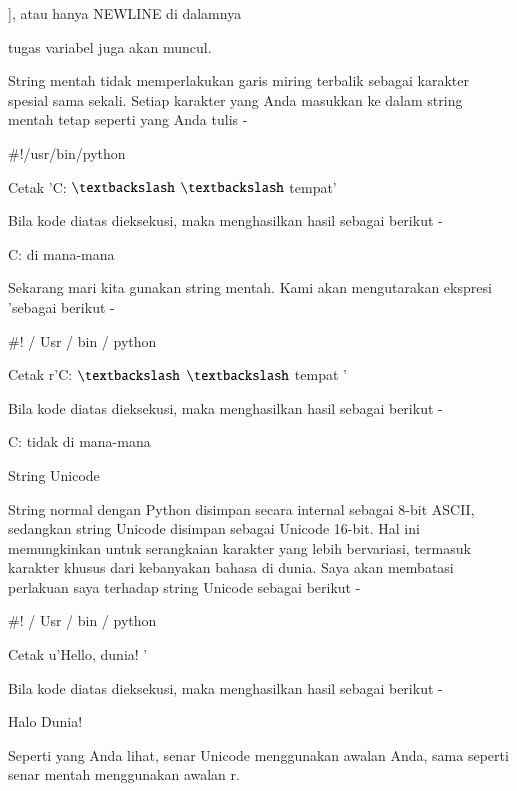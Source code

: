 \documentclass[a4paper,12pt]{report}
\begin{document}
\noindent 
 $  $], atau hanya NEWLINE di dalamnya \par
\noindent 
tugas variabel juga akan muncul. \par
\noindent 
String mentah tidak memperlakukan garis miring terbalik sebagai karakter spesial sama sekali. Setiap karakter yang Anda masukkan ke dalam string mentah tetap seperti yang Anda tulis - \par
\noindent 
\vspace{12pt}
\noindent 
 $  \#  $!/usr/bin/python \par
\noindent 
\vspace{12pt}
\noindent 
Cetak 'C:  $  \textbackslash  $ $  \textbackslash  $ tempat' \par
\noindent 
Bila kode diatas dieksekusi, maka menghasilkan hasil sebagai berikut - \par
\noindent 
C: di mana-mana \par
\noindent 
Sekarang mari kita gunakan string mentah. Kami akan mengutarakan ekspresi 'sebagai berikut - \par
\vspace{12pt}
\noindent 
 $  \#  $! / Usr / bin / python \par
\vspace{12pt}
\noindent 
Cetak r'C:  $  \textbackslash  $ $  \textbackslash  $ tempat ' \par
\vspace{12pt}
\noindent 
Bila kode diatas dieksekusi, maka menghasilkan hasil sebagai berikut - \par
\noindent 
C: tidak di mana-mana \par
\noindent 
String Unicode \par
\noindent 
String normal dengan Python disimpan secara internal sebagai 8-bit ASCII, sedangkan string Unicode disimpan sebagai Unicode 16-bit. Hal ini memungkinkan untuk serangkaian karakter yang lebih bervariasi, termasuk karakter khusus dari kebanyakan bahasa di dunia. Saya akan membatasi perlakuan saya terhadap string Unicode sebagai berikut - \par
\vspace{12pt}
\noindent 
 $  \#  $! / Usr / bin / python \par
\vspace{12pt}
\noindent 
Cetak u'Hello, dunia! ' \par
\noindent 
Bila kode diatas dieksekusi, maka menghasilkan hasil sebagai berikut - \par
\noindent 
Halo Dunia! \par
\noindent 
Seperti yang Anda lihat, senar Unicode menggunakan awalan Anda, sama seperti senar mentah menggunakan awalan r. \par
\vspace{12pt}
\noindent 
\end{document}
